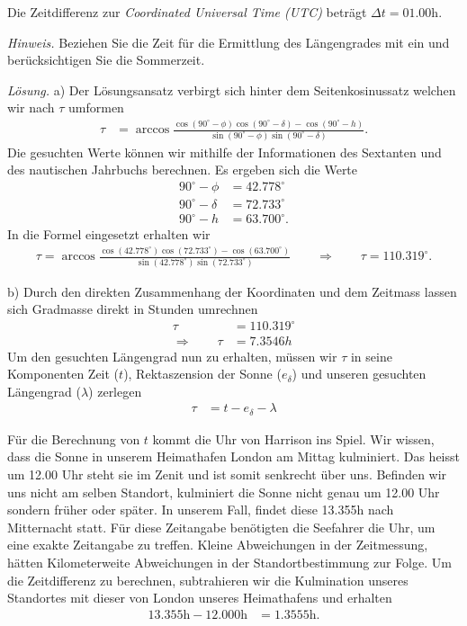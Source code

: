 \begin{refsection}
Die Zeitdifferenz zur {\em Coordinated Universal Time (UTC)} beträgt $\Delta{t}=01.00$h. 

\bigskip

\textit{Hinweis.} Beziehen Sie die Zeit für die Ermittlung des
Längengrades mit ein und berücksichtigen Sie die Sommerzeit. 

\bigskip

\textit{Lösung.} \quad a) Der Lösungsansatz verbirgt sich hinter
dem Seitenkosinussatz welchen wir nach $\tau$ umformen
\begin{align*}
\tau &= \arccos 
\frac{ \cos(90^{\circ} - \phi) \cos(90^{\circ} - \delta) - \cos(90^{\circ} - h)} {\sin(90^{\circ} - \phi)\sin(90^{\circ} - \delta)}.
\end{align*}
Die gesuchten Werte können wir mithilfe der Informationen des
Sextanten und des nautischen Jahrbuchs berechnen. Es ergeben sich
die Werte
\begin{align*}
90^{\circ} - \phi &= 42.778^{\circ}
\\
90^{\circ} - \delta &= 72.733^{\circ}
\\
90^{\circ} - h &= 63.700^{\circ}.
\end{align*}
In die Formel eingesetzt erhalten wir
\begin{align*}
\tau = \arccos 
\frac{ \cos(42.778^{\circ}) \cos(72.733^{\circ}) - \cos(63.700^{\circ})} {\sin(42.778^{\circ})\sin(72.733^{\circ})}
\qquad \Rightarrow \qquad
\tau = 110.319^{\circ}.
\end{align*}

b) \quad  Durch den direkten Zusammenhang der Koordinaten und dem
Zeitmass lassen sich Gradmasse direkt in Stunden umrechnen
\begin{align*}
\tau &= 110.319^{\circ} \\
\Rightarrow \quad \quad
\tau &= 7.3546h
\end{align*}
Um den gesuchten Längengrad nun zu erhalten, müssen wir $\tau$ in
seine Komponenten Zeit ($t$), Rektaszension der Sonne ($e_\delta$)
und unseren gesuchten Längengrad ($\lambda$) zerlegen
\begin{align*}
\tau &= t - e_\delta - \lambda 
\end{align*}


Für die Berechnung von $t$ kommt die Uhr von Harrison ins Spiel.
Wir wissen, dass die Sonne in unserem Heimathafen London am Mittag
kulminiert. Das heisst um 12.00 Uhr steht sie im Zenit und ist somit
senkrecht über uns.
Befinden wir uns nicht am selben Standort, kulminiert die Sonne
nicht genau um 12.00 Uhr sondern früher oder später.
In unserem Fall, findet diese 13.355h nach Mitternacht statt. Für
diese Zeitangabe benötigten die Seefahrer die Uhr, um eine exakte
Zeitangabe zu treffen. Kleine Abweichungen in der Zeitmessung,
hätten Kilometerweite Abweichungen in der Standortbestimmung zur
Folge.
Um die Zeitdifferenz zu berechnen, subtrahieren wir die Kulmination
unseres Standortes mit dieser von London unseres Heimathafens und
erhalten
\begin{align*}
13.355 \text{h} - 12.000 \text{h} &= 1.3555 \text{h}.
\end{align*}


\end{refsection}
